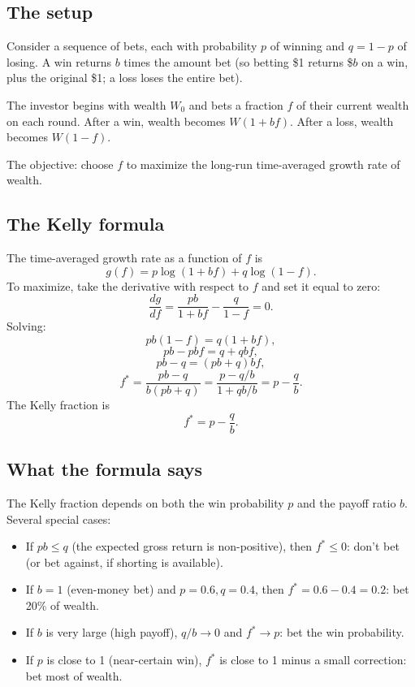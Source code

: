 \subsection{The setup}

Consider a sequence of bets, each with probability $p$ of winning and
$q = 1 - p$ of losing. A win returns $b$ times the amount bet (so
betting \$1 returns \$$b$ on a win, plus the original \$1; a loss
loses the entire bet).

The investor begins with wealth $W_0$ and bets a fraction $f$ of
their current wealth on each round. After a win, wealth becomes
$W(1 + bf)$. After a loss, wealth becomes $W(1 - f)$.

The objective: choose $f$ to maximize the long-run time-averaged
growth rate of wealth.

\subsection{The Kelly formula}

The time-averaged growth rate as a function of $f$ is
\[
    g(f) = p \log(1 + bf) + q \log(1 - f).
\]
To maximize, take the derivative with respect to $f$ and set it
equal to zero:
\[
    \frac{dg}{df} = \frac{pb}{1 + bf} - \frac{q}{1 - f} = 0.
\]
Solving:
\[
    pb(1 - f) = q(1 + bf),
\]
\[
    pb - pbf = q + qbf,
\]
\[
    pb - q = (pb + q) bf,
\]
\[
    f^* = \frac{pb - q}{b(pb + q)} = \frac{p - q/b}{1 + q b / b} = p - \frac{q}{b}.
\]
The Kelly fraction is
\[
    \boxed{f^* = p - \frac{q}{b}.}
\]

\subsection{What the formula says}

The Kelly fraction depends on both the win probability $p$ and the
payoff ratio $b$. Several special cases:

\begin{itemize}[leftmargin=2em]
    \item If $pb \leq q$ (the expected gross return is non-positive),
    then $f^* \leq 0$: don't bet (or bet against, if shorting is
    available).
    \item If $b = 1$ (even-money bet) and $p = 0.6, q = 0.4$, then
    $f^* = 0.6 - 0.4 = 0.2$: bet 20\% of wealth.
    \item If $b$ is very large (high payoff), $q/b \to 0$ and
    $f^* \to p$: bet the win probability.
    \item If $p$ is close to 1 (near-certain win), $f^*$ is close
    to 1 minus a small correction: bet most of wealth.
\end{itemize}

